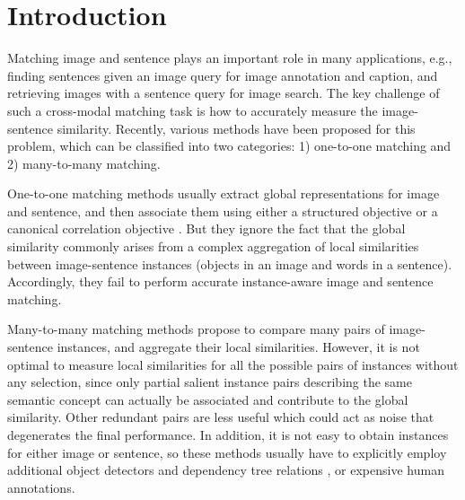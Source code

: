 \documentclass[10pt,twocolumn,letterpaper]{article}
\begin{document}
\section{Introduction}





Matching image and sentence plays an important role in many applications,
e.g., finding sentences given an image query for image annotation and caption,
and retrieving images with a sentence query for image search.
The key challenge of such a cross-modal matching task is
how to accurately measure the image-sentence similarity.
Recently, various methods have been proposed for this problem,
which can be classified into two categories:
1) one-to-one matching and 2) many-to-many matching.

One-to-one matching methods usually extract
global representations for image and sentence,
and then associate them using either a structured objective \cite{frome2013devise,kiros2014unifying,vendrov2015order}
or a canonical correlation objective \cite{yan2015deep,klein2015associating}.
But they ignore the fact that
the global similarity commonly arises from a
complex aggregation of local similarities
between image-sentence instances (objects in an image and words in a sentence).
Accordingly, they fail to perform accurate instance-aware image and sentence matching.










Many-to-many matching methods \cite{karpathy2014deep,karpathy2014vsa,plummer2015flickr30k}
propose to compare many pairs of image-sentence instances,
and aggregate their local similarities.
However, it is not optimal to measure local similarities for all the possible
pairs of instances without any selection,
since only partial salient instance pairs describing the same semantic concept
can actually be associated and contribute to the global similarity.
Other redundant pairs are less useful which could
act as noise that degenerates the final performance.
In addition, it is not easy to obtain instances for either image or sentence,
so these methods usually have to explicitly employ additional object detectors \cite{de2006generating}
and dependency tree relations \cite{girshick2014rich}, or expensive human annotations.
\end{document}
